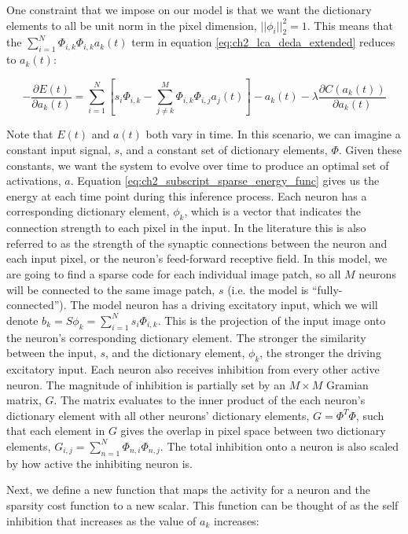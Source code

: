 One constraint that we impose on our model is that we want the dictionary elements to all be unit norm in the pixel dimension, $||\phi_{i}||_2^2 = 1$. This means that the $\sum_{i=1}^{N}\Phi_{i,k}\Phi_{i,k}a_{k}(t)$ term in equation \eqref{eq:ch2_lca_deda_extended} reduces to $a_k(t)$:

\begin{equation}\label{eq:ch2_lca_deda}
    -\frac{\partial E(t)}{\partial a_{k}(t)} =
    \sum\limits_{i=1}^{N} \left[ s_{i} \Phi_{i,k} -
    \sum\limits_{j \neq k}^{M} \Phi_{i,k} \Phi_{i,j} a_{j}(t) \right] - a_{k}(t) -
    \lambda \frac{\partial C(a_{k}(t))}{\partial a_{k}(t)}
\end{equation}

Note that $E(t)$ and $a(t)$ both vary in time. In this scenario, we can imagine a constant input signal, $s$, and a constant set of dictionary elements, $\Phi$. Given these constants, we want the system to evolve over time to produce an optimal set of activations, $a$. Equation \eqref{eq:ch2_subscript_sparse_energy_func} gives us the energy at each time point during this inference process. Each neuron has a corresponding dictionary element, $\phi_{k}$, which is a vector that indicates the connection strength to each pixel in the input. In the literature this is also referred to as the strength of the synaptic connections between the neuron and each input pixel, or the neuron's feed-forward receptive field. In this model, we are going to find a sparse code for each individual image patch, so all $M$ neurons will be connected to the same image patch, $s$ (i.e. the model is ``fully-connected''). The model neuron has a driving excitatory input, which we will denote $b_{k} = S\phi_{k} = \sum_{i=1}^{N}s_{i} \Phi_{i,k}$. This is the projection of the input image onto the neuron's corresponding dictionary element. The stronger the similarity between the input, $s$, and the dictionary element, $\phi_{k}$, the stronger the driving excitatory input. Each neuron also receives inhibition from every other active neuron. The magnitude of inhibition is partially set by an $M \times M$ Gramian matrix, $G$. The matrix evaluates to the inner product of the each neuron's dictionary element with all other neurons' dictionary elements, $G = \Phi^T\Phi$, such that each element in $G$ gives the overlap in pixel space between two dictionary elements, $G_{i,j} = \sum\limits_{n=1}^{N} \Phi_{n,i}\Phi_{n,j}$. The total inhibition onto a neuron is also scaled by how active the inhibiting neuron is.

Next, we define a new function that maps the activity for a neuron and the sparsity cost function to a new scalar. This function can be thought of as the self inhibition that increases as the value of $a_{k}$ increases:

